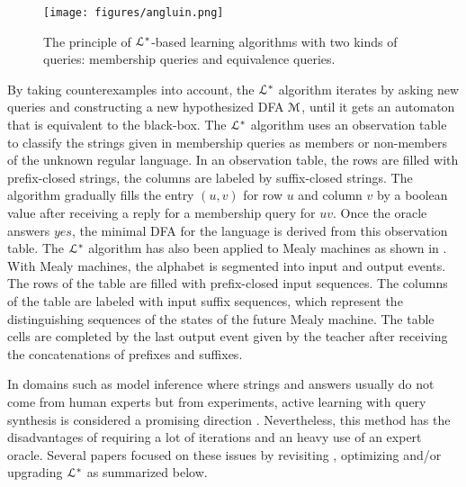 \begin{figure}[h]
    \begin{center}
        \texttt{[image: figures/angluin.png]}
    \end{center}

    \caption{The principle of $\EuScript{L}^*$-based learning
    algorithms with two kinds of queries: membership queries and
    equivalence queries.}
    \label{fig:angluin}
\end{figure}

By taking counterexamples into account, the $\EuScript{L}^*$
algorithm iterates by asking new queries and constructing a new
hypothesized DFA $\EuScript{M}$, until it gets an automaton that
is equivalent to the black-box. The $\EuScript{L}^*$ algorithm
uses an observation table to classify the strings given in
membership queries as members or non-members of the unknown
regular language. In an observation table, the rows are filled
with prefix-closed strings, the columns are labeled by
suffix-closed strings. The algorithm gradually fills the entry
$(u,v)$ for row $u$ and column $v$ by a boolean value after
receiving a reply for a membership query for $uv$. Once the
oracle answers $yes$, the minimal DFA for the language is derived
from this observation table. The $\EuScript{L}^*$ algorithm has
also been applied to Mealy machines \cite{6771467} as shown in
\cite{DBLP:phd/de/Niese2003,steffen11}.  With Mealy machines, the
alphabet is segmented into input and output events. The rows of
the table are filled with prefix-closed input sequences. The
columns of the table are labeled with input suffix sequences,
which represent the distinguishing sequences of the states of the
future Mealy machine. The table cells are completed by the last
output event given by the teacher after receiving the
concatenations of prefixes and suffixes.

In domains such as model inference where strings and answers
usually do not come from human experts but from experiments,
active learning with query synthesis is considered a promising
direction \cite{settles.tr09}. Nevertheless, this method has the
disadvantages of requiring a lot of iterations and an heavy use
of an expert oracle. Several papers focused on these issues by
revisiting \cite{regularinfBerg06,regularinfBerg08}, optimizing
and/or upgrading $\EuScript{L}^*$
\cite{Raffelt:2005:LLA:1081180.1081189,irfan12} as summarized
below.

